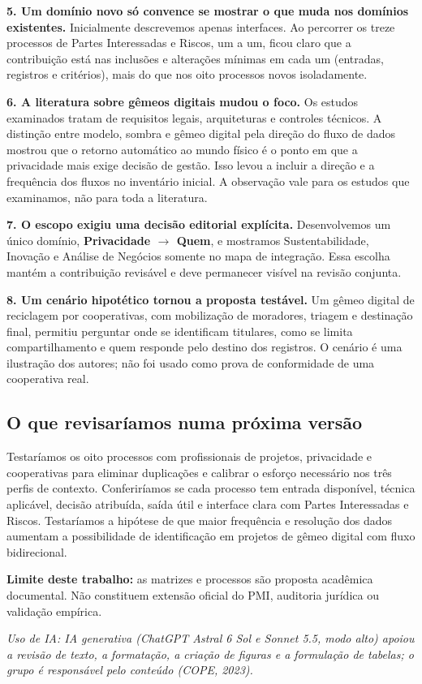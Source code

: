 \documentclass[12pt,a4paper,article,oneside,english,brazil]{abntex2}
\begin{document}
\textbf{5. Um domínio novo só convence se mostrar o que muda nos domínios existentes.} Inicialmente descrevemos apenas interfaces. Ao percorrer os treze processos de Partes Interessadas e Riscos, um a um, ficou claro que a contribuição está nas inclusões e alterações mínimas em cada um (entradas, registros e critérios), mais do que nos oito processos novos isoladamente.

\textbf{6. A literatura sobre gêmeos digitais mudou o foco.} Os estudos examinados tratam de requisitos legais, arquiteturas e controles técnicos. A distinção entre modelo, sombra e gêmeo digital pela direção do fluxo de dados mostrou que o retorno automático ao mundo físico é o ponto em que a privacidade mais exige decisão de gestão. Isso levou a incluir a direção e a frequência dos fluxos no inventário inicial. A observação vale para os estudos que examinamos, não para toda a literatura.

\textbf{7. O escopo exigiu uma decisão editorial explícita.} Desenvolvemos um único domínio, \textbf{Privacidade \ensuremath{\rightarrow} Quem}, e mostramos Sustentabilidade, Inovação e Análise de Negócios somente no mapa de integração. Essa escolha mantém a contribuição revisável e deve permanecer visível na revisão conjunta.

\textbf{8. Um cenário hipotético tornou a proposta testável.} Um gêmeo digital de reciclagem por cooperativas, com mobilização de moradores, triagem e destinação final, permitiu perguntar onde se identificam titulares, como se limita compartilhamento e quem responde pelo destino dos registros. O cenário é uma ilustração dos autores; não foi usado como prova de conformidade de uma cooperativa real.

\subsection*{O que revisaríamos numa próxima versão}

Testaríamos os oito processos com profissionais de projetos, privacidade e cooperativas para eliminar duplicações e calibrar o esforço necessário nos três perfis de contexto. Conferiríamos se cada processo tem entrada disponível, técnica aplicável, decisão atribuída, saída útil e interface clara com Partes Interessadas e Riscos. Testaríamos a hipótese de que maior frequência e resolução dos dados aumentam a possibilidade de identificação em projetos de gêmeo digital com fluxo bidirecional.

\textbf{Limite deste trabalho:} as matrizes e processos são proposta acadêmica documental. Não constituem extensão oficial do PMI, auditoria jurídica ou validação empírica.

\vspace{\onelineskip}
{\footnotesize\SingleSpacing\noindent\textit{Uso de IA: IA generativa (ChatGPT Astral 6 Sol e Sonnet 5.5, modo alto) apoiou a revisão de texto, a formatação, a criação de figuras e a formulação de tabelas; o grupo é responsável pelo conteúdo (COPE, 2023).}\par}
\end{document}
